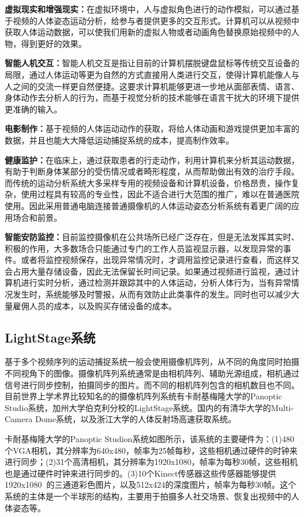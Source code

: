 \textbf{虚拟现实和增强现实：}在虚拟环境中，人与虚拟角色进行的动作模拟，可以通过基于视频的人体姿态运动分析，给参与者提供更多的交互形式。计算机可以从视频中获取人体运动数据，可以使我们用新的虚拟人物或者动画角色替换原始视频中的人物，得到更好的效果。

\textbf{智能人机交互：}智能人机交互是指让目前的计算机摆脱键盘鼠标等传统交互设备的局限，通过人体运动等更为自然的方式直接用人类进行交互，使得计算机能像人与人之间的交流一样更自然便捷。这要求计算机能够更进一步地从面部表情、语言、身体动作去分析人的行为，而基于视觉分析的技术能够在语言干扰大的环境下提供更准确的输入。

\textbf{电影制作：}基于视频的人体运动动作的获取，将给人体动画和游戏提供更加丰富的数据，并且也能大大降低运动捕捉系统的成本，提高制作效率。

\textbf{健康监护：}在临床上，通过获取患者的行走动作，利用计算机来分析其运动数据，有助于判断身体某部分的受伤情况或者畸形程度，从而帮助做出有效的治疗手段。而传统的运动分析系统大多采样专用的视频设备和计算机设备，价格昂贵，操作复杂，使用过程具有较高的专业性，因此不适合进行大范围的推广，难以在普通医院使用。因此采用普通电脑连接普通摄像机的人体运动姿态分析系统有着更广阔的应用场合和前景。

\textbf{智能安防监控：}目前监控摄像机在公共场所已经广泛存在，但是无法发挥其实时、积极的作用，大多数场合只能通过专门的工作人员监视显示器，以发现异常的事件。或者将监控视频保存，出现异常情况时，才调用监控记录进行查看，而这样又会占用大量存储设备，因此无法保留长时间记录。如果通过视频进行监视，通过计算机进行实时分析，通过检测并跟踪其中的人体运动，分析人体行为，当有异常情况发生时，系统能够及时警报，从而有效防止此类事件的发生。同时也可以减少大量雇佣人员的成本，以及购买存储设备的成本。

\subsection{LightStage系统}
基于多个视频序列的运动捕捉系统一般会使用摄像机阵列，从不同的角度同时拍摄不同视角下的图像。摄像机阵列系统通常是由相机阵列、辅助光源组成，相机通过信号进行同步控制，拍摄同步的图片。而不同的相机阵列包含的相机数目也不同。目前世界上学术界比较知名的的摄像机阵列系统有卡耐基梅隆大学的Panoptic Studio系统，加州大学伯克利分校的LightStage系统。国内的有清华大学的Multi-Camera Dome系统，以及浙江大学的人体反射场高速获取系统。

卡耐基梅隆大学的Panoptic Studion系统如图所示，该系统的主要硬件为：(1)480个VGA相机，其分辨率为640x480，帧率为25帧每秒，这些相机通过硬件的时钟来进行同步；(2)31个高清相机，其分辨率为1920x1080，帧率为每秒30帧，这些相机也是通过硬件时钟来进行同步的。(3)10个Kinect传感器这些传感器能够提供1920x1080的三通道彩色图片，以及512x424的深度图片，帧率为每秒30帧。这个系统的主体是一个半球形的结构，主要用于拍摄多人社交场景、恢复出视频中的人体姿态等。


